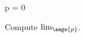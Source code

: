\documentclass{ximera}
\author{Jim Fowler}
\begin{document}
\begin{sagesilent}
  p = 0
\end{sagesilent}

\begin{exercise}

  Compute $\mathrm{lim}_{\sage{p}}$.


  
\end{exercise}
\end{document}
